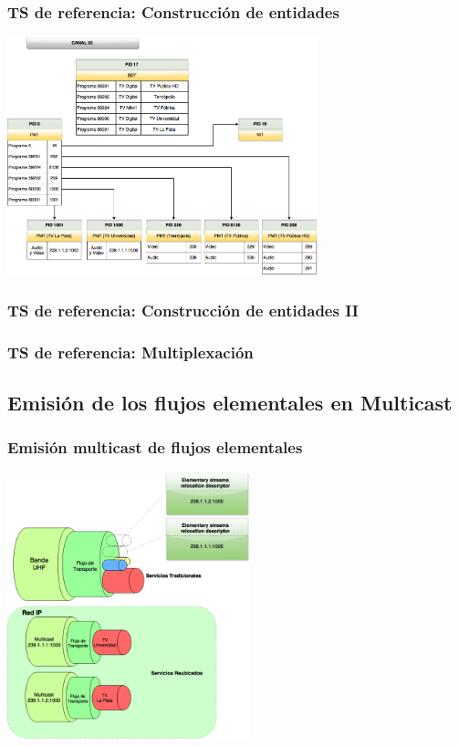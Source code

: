 \documentclass[a4paper,11pt]{beamer}
\begin{document}
		\begin{frame}
			\frametitle{TS de referencia: Construcción de entidades}
			\begin{center}
				\includegraphics[width=9cm]{canal_23_extended_tables.png}
			\end{center}	
		\end{frame}

		\begin{frame}
			\frametitle{TS de referencia: Construcción de entidades II}
			\resizebox{\textwidth}{!}{
				
			}
		\end{frame}

		\begin{frame}
			\frametitle{TS de referencia: Multiplexación}
			\resizebox{\textwidth}{!}{
				
			}
		\end{frame}

	\subsection{Emisión de los flujos elementales en Multicast}
		\begin{frame}
			\frametitle{Emisión multicast de flujos elementales}
			\begin{center}
				\includegraphics[width=7cm]{cable_flujo_c23e_ts.png}
			\end{center}
		\end{frame}
		
\end{document}
